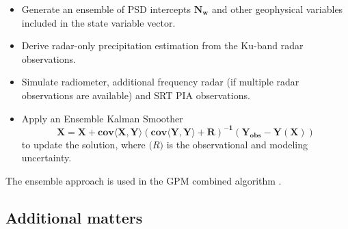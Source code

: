\documentclass[10pt]{ietbook}
\begin{document}
\begin{itemize}
    \item Generate an ensemble of PSD intercepts $\mathbf{N_w}$ and other geophysical variables included in the state variable vector.
    \item Derive radar-only precipitation estimation from the Ku-band radar observations.
    \item Simulate radiometer, additional frequency radar (if multiple radar observations are available) and SRT PIA observations.
    \item Apply an Ensemble Kalman Smoother
    \begin{equation}
        \mathbf{X=X+cov\langle X,Y \rangle (cov\langle Y,Y \rangle +R)^{-1} (Y_{obs}-Y(X))}
    \end{equation}
    to update the solution, where $\mathbf(R)$ is the observational and modeling uncertainty.
\end{itemize}
The ensemble approach is used in the GPM combined algorithm \cite{grecu2016}.

\subsection{Additional matters}
\end{document}
